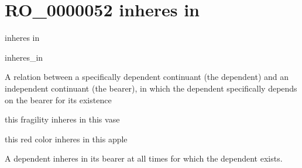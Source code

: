 \documentclass[letterpaper,10pt,english]{sphinxmanual}
\begin{document}
\section{RO\_0000052 \sphinxhyphen{} inheres in}
\label{\detokenize{doc-RO_0000052:ro-0000052-inheres-in}}\label{\detokenize{doc-RO_0000052:index-0}}\label{\detokenize{doc-RO_0000052::doc}}
\begin{sphinxShadowBox}

\sphinxAtStartPar
inheres in
\end{sphinxShadowBox}

\begin{sphinxShadowBox}

\sphinxAtStartPar
inheres\_in
\end{sphinxShadowBox}

\begin{sphinxShadowBox}

\sphinxAtStartPar
A relation between a specifically dependent continuant (the dependent) and an independent continuant (the bearer), in which the dependent specifically depends on the bearer for its existence
\end{sphinxShadowBox}

\begin{sphinxShadowBox}

\sphinxAtStartPar
this fragility inheres in this vase

\sphinxAtStartPar
this red color inheres in this apple
\end{sphinxShadowBox}

\begin{sphinxShadowBox}

\sphinxAtStartPar
A dependent inheres in its bearer at all times for which the dependent exists.
\end{sphinxShadowBox}

\begin{sphinxShadowBox}

\sphinxAtStartPar
{}
\end{sphinxShadowBox}
\begin{quote}
\label{\detokenize{doc-RO_0000053:ro-0000053}}\label{\detokenize{doc-RO_0000053:bearer-of}}\label{\detokenize{doc-RO_0000053:ro-0000053}}
\ignorespaces \end{quote}
\end{document}

